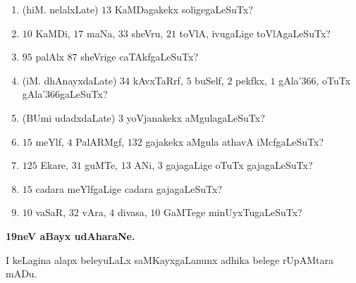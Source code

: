\begin{enumerate}[\rm(1)]
\item (hiM. nelalxLate) $13$ KaMDagakekx soligegaLeSuTx?
\item $10$ KaMDi, $17$ maNa, $33$ sheVru, $21$ toVlA, ivugaLige toVlAgaLeSuTx?

\item $95$ palAlx $87$ sheVrige caTAkfgaLeSuTx?

\item (iM. dhAnayxdaLate) $34$ kAvxTaRrf, $5$ buSelf, $2$ pekfkx, $1$ gAla\char'366, oTuTx gAla\char'366gaLeSuTx?

\item (BUmi udadxdaLate) $3$ yoVjanakekx aMgulagaLeSuTx?

\item $15$ meYlf, $4$ PalARMgf, $132$ gajakekx aMgula athavA iMcfgaLeSuTx?

\item $125$ Ekare, $31$ guMTe, $13$ ANi, $3$ gajagaLige oTuTx gajagaLeSuTx?

\item $15$ cadara meYlfgaLige cadara gajagaLeSuTx?
\item $10$ vaSaR, $32$ vAra, $4$ divasa, $10$ GaMTege minUyxTugaLeSuTx?
\end{enumerate}

\medskip

\begin{center}
{\bf\Large {19neV aBayx udAharaNe.}}
\end{center}

I keLagina alapx beleyuLaLx saMKayxgaLanunx adhika belege rUpAMtara mADu.

